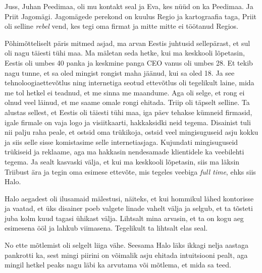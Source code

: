 
Juss, Juhan Peedimaa, oli mu kontakt seal ja Eva, kes nüüd on ka Peedimaa. Ja Priit Jagomägi. Jagomägede perekond on kuulus Regio ja kartograafia taga, Priit oli selline \emph{rebel} vend, kes tegi oma firmat ja mitte mitte ei töötanud Regios. 

Põhimõtteliselt päris mitmed asjad, ma arvan Eestis juhtusid  sellepärast, et sul oli nagu täiesti tühi maa. Ma mäletan seda hetke, kui ma keskkooli lõpetasin, Eestis oli umbes 40 panka ja keskmine panga CEO vanus oli umbes 28. Et tekib nagu tunne, et sa oled mingist rongist maha jäänud, kui sa oled 18. Ja see tehnoloogiaettevõtlus ning internetiga seotud ettevõtlus oli tegelikult  laine, mida me tol hetkel ei teadnud, et me sinna me maandume. Aga  oli selge, et rong ei olnud veel läinud, et me saame omale rongi ehitada. Triip oli täpselt selline. Ta alustas sellest, et Eestis oli täiesti tühi maa, iga päev tehakse kümneid firmasid, igale firmale on vaja logo ja visiitkaarti,  hakkaksidki neid tegema. Disainist tuli nii palju raha peale, et ostsid oma trükikoja, ostsid veel mingisuguseid asju kokku ja siis selle sisse komistasime selle internetiasjaga. Kujundati mingisuguseid trükiseid ja reklaame, aga ma hakkasin nendesamade klientidele ka veebilehti tegema. Ja sealt kasvaski välja, et kui ma keskkooli lõpetasin, siis ma läksin Triibust ära ja tegin oma esimese ettevõte, mis tegeles veebiga \emph{full time}, ehks siis Halo. 

Halo aegadest oli ilusamaid mälestusi, näiteks, et kui hommikul lähed kontorisse ja  vaatad, et üks disainer poeb valgete linade vahelt välja ja selgub, et ta tõsteti juba kolm kuud tagasi ühikast välja. Lihtsalt mina arvasin, et ta on kogu aeg esimesena ööl ja lahkub viimasena. Tegelikult ta lihtsalt elas seal.


No ette mõtlemist oli selgelt liiga vähe. Seesama Halo läks ikkagi nelja aastaga pankrotti ka, sest mingi piirini  on võimalik asju ehitada intuitsiooni pealt, aga mingil hetkel peaks nagu läbi ka arvutama või mõtlema, et mida sa teed. 

